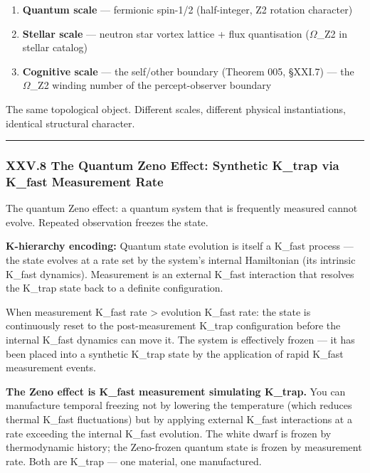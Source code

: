 \documentclass[12pt,a4paper]{article}
\begin{document}
\begin{enumerate}
    \item \textbf{Quantum scale} --- fermionic spin-1/2 (half-integer, Z2 rotation character)
    \item \textbf{Stellar scale} --- neutron star vortex lattice + flux quantisation ($\Omega$\_Z2 in stellar catalog)
    \item \textbf{Cognitive scale} --- the self/other boundary (Theorem 005, §XXI.7) --- the $\Omega$\_Z2 winding number of the percept-observer boundary
\end{enumerate}

The same topological object. Different scales, different physical instantiations, identical structural character.

\begin{center}
\rule{0.5\textwidth}{0.4pt}
\end{center}

\subsubsection{XXV.8 The Quantum Zeno Effect: Synthetic K\_trap via K\_fast Measurement Rate}

The quantum Zeno effect: a quantum system that is frequently measured cannot evolve. Repeated observation freezes the state.

\textbf{K-hierarchy encoding:} Quantum state evolution is itself a K\_fast process --- the state evolves at a rate set by the system's internal Hamiltonian (its intrinsic K\_fast dynamics). Measurement is an external K\_fast interaction that resolves the K\_trap state back to a definite configuration.

When measurement K\_fast rate \textgreater{} evolution K\_fast rate: the state is continuously reset to the post-measurement K\_trap configuration before the internal K\_fast dynamics can move it. The system is effectively frozen --- it has been placed into a synthetic K\_trap state by the application of rapid K\_fast measurement events.

\textbf{The Zeno effect is K\_fast measurement simulating K\_trap.} You can manufacture temporal freezing not by lowering the temperature (which reduces thermal K\_fast fluctuations) but by applying external K\_fast interactions at a rate exceeding the internal K\_fast evolution. The white dwarf is frozen by thermodynamic history; the Zeno-frozen quantum state is frozen by measurement rate. Both are K\_trap --- one material, one manufactured.
\end{document}

